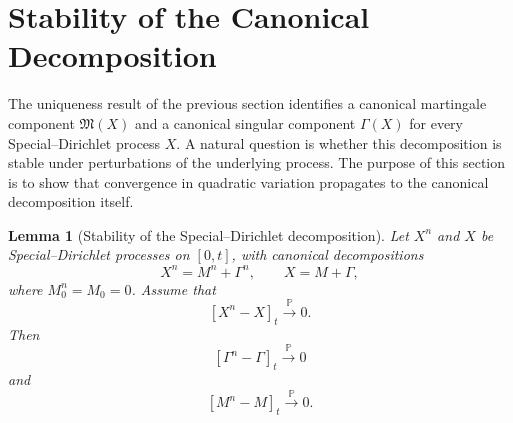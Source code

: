 \documentclass[a4paper,10pt]{article}
\newtheorem{lemma}[thm]{Lemma}
\begin{document}
\section{Stability of the Canonical Decomposition}
The uniqueness result of the previous section identifies a canonical
martingale component $\mathfrak{M}(X)$ and a canonical singular component
$\mathfrak{\Gamma}(X)$ for every Special--Dirichlet process \(X\).
A natural question is whether this decomposition is stable under
perturbations of the underlying process.
The purpose of this section is to show that convergence in quadratic
variation propagates to the canonical decomposition itself.
\begin{lemma}[Stability of the Special--Dirichlet decomposition]
\label{lem:SD-decomposition-stability}
Let \(X^n\) and \(X\) be Special--Dirichlet processes on \([0,t]\), with
canonical decompositions
\[
        X^n=M^n+\Gamma^n,
        \qquad
        X=M+\Gamma,
\]
where \(M^n_0=M_0=0\). Assume that
\[
        [X^n-X]_t \xrightarrow{\mathbb P} 0 .
\]
Then
\[
        [\Gamma^n-\Gamma]_t \xrightarrow{\mathbb P} 0
\]
and
\[
        [M^n-M]_t \xrightarrow{\mathbb P} 0 .
\]
\end{lemma}
\end{document}
